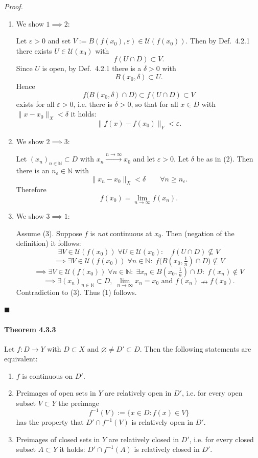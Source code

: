 \documentclass[12pt]{article}
\begin{document}
\emph{Proof.}
\begin{enumerate}[label=\alph*)]
	\item We show $1 \implies 2$:
  
		Let $\varepsilon > 0$ and set $V := B(f(x_0),\varepsilon) \in \mathcal U(f(x_0))$. Then by Def.~4.2.1 there exists $U \in \mathcal U(x_0)$ with
	\[
		f(U \cap D) \subset V.
	\]
	Since $U$ is open, by Def.~4.2.1 there is a $\delta > 0$ with
	\[
		B(x_0,\delta) \subset U.
	\]
	Hence
	\[
		f\bigl(B(x_0,\delta) \cap D\bigr) \subset f(U \cap D) \subset V
	\]
	exists for all $\varepsilon > 0$, i.e. there is $\delta > 0$, so that for all $x \in D$ with $\|x - x_0\|_X < \delta$ it holds:
	\[
		\|f(x) - f(x_0)\|_Y < \varepsilon.
	\]
	\item We show $2 \implies 3$:
  
	Let $(x_n)_{n\in\mathbb N} \subset D$ with $x_n \xrightarrow{n\to\infty} x_0$ and let $\varepsilon > 0$. Let $\delta$ be as in (2). Then there is an $n_\varepsilon \in \mathbb N$ with
	\[
		\|x_n - x_0\|_X < \delta \qquad \forall n \ge n_\varepsilon.
	\]
	Therefore
	\[
		f(x_0) = \lim_{n\to\infty} f(x_n).
	\]
	\item We show $3 \implies 1$:
  
	Assume (3). Suppose $f$ is \emph{not} continuous at $x_0$. Then (negation of the definition) it follows:
	\[
		\exists V \in \mathcal U(f(x_0))\; \forall U \in \mathcal U(x_0): \quad f(U \cap D) \nsubseteq V
	\]
	\[\implies \exists V \in \mathcal U(f(x_0))\; \forall n \in \mathbb N:\; f\bigl(B(x_0,\tfrac{1}{n}) \cap D\bigr) \nsubseteq V \]
	\[\implies \exists V \in \mathcal U(f(x_0))\; \forall n \in \mathbb N:\; \exists x_n \in B(x_0,\tfrac{1}{n}) \cap D:\; f(x_n) \notin V \]
	\[\implies \exists (x_n)_{n\in\mathbb N} \subset D,\; \lim_{n\to\infty} x_n = x_0 \text{ and } f(x_n) \nrightarrow f(x_0).\]
	Contradiction to (3). Thus (1) follows.
\end{enumerate}
\hfill $\blacksquare$

\paragraph{Theorem 4.3.3} Let $f : D \to Y$ with $D \subset X$ and $\varnothing \neq D' \subset D$. Then the following statements are equivalent:
\begin{enumerate}[label=({\arabic*})]
	\item $f$ is continuous on $D'$.
	\item Preimages of open sets in $Y$ are relatively open in $D'$, i.e. for every open subset $V \subset Y$ the preimage
	\[
		f^{-1}(V) := \{ x \in D : f(x) \in V \}
	\]
	has the property that $D' \cap f^{-1}(V)$ is relatively open in $D'$.
	\item Preimages of closed sets in $Y$ are relatively closed in $D'$, i.e. for every closed subset $A \subset Y$ it holds: $D' \cap f^{-1}(A)$ is relatively closed in $D'$.
\end{enumerate}
\end{document}
